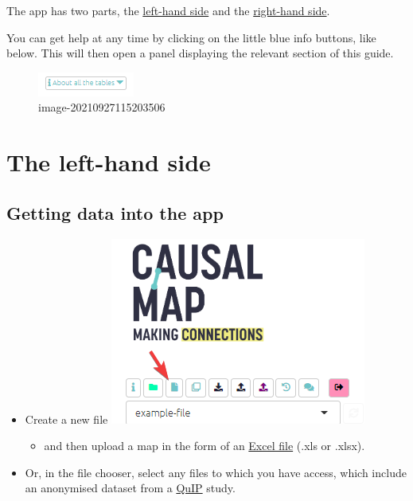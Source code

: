 \documentclass[
]{book}
\providecommand{\tightlist}{%
  \setlength{\itemsep}{0pt}\setlength{\parskip}{0pt}}
\begin{document}
The app has two parts, the \protect\hyperlink{xlhs}{left-hand side} and the \protect\hyperlink{rhs}{right-hand side}.

You can get help at any time by clicking on the little blue info buttons, like below. This will then open a panel displaying the relevant section of this guide.

\begin{figure}
\centering
\includegraphics{_assets/image-20210927115203506.png}
\caption{image-20210927115203506}
\end{figure}

\hypertarget{xlhs}{%
\section{The left-hand side}\label{xlhs}}

\hypertarget{getting-data-into-the-app}{%
\subsection{Getting data into the app}\label{getting-data-into-the-app}}

\begin{itemize}
\tightlist
\item
  Create a new file \includegraphics{_assets/image-20220723134329170.png}

  \begin{itemize}
  \tightlist
  \item
    and then upload a map in the form of an \protect\hyperlink{xuploading-and-updating}{Excel file} (.xls or .xlsx).
  \end{itemize}
\item
  Or, in the file chooser, select any files to which you have access, which include an anonymised dataset from a \href{http://bathsdr.org/}{QuIP} study.
\end{itemize}
\end{document}
